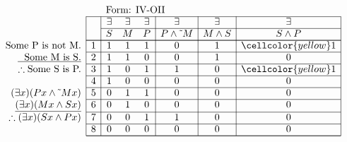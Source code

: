 \documentclass[10pt,legalpaper,landscape,cmtt]{article}
\begin{document}
{\begin{minipage}[t]{3.25in}
	\(
	\begin{array}{r|c|ccc|c|c|c|}
		\multicolumn{2}{c}{}&\multicolumn{6}{l}{\mbox{Form: IV-OII}} \\ \cline{2-8}
		\hspace{1in}	&	& \exists & \exists & \exists & \exists & \exists & \exists\\ \cline{3-8}
		&	& S & M & P &  P \wedge \tilde~M  &  M \wedge S  &  S \wedge P \\ \cline{2-8} \cline{2-8}
		\phantom{\therefore}\mbox{Some P is not M.}   & 1 & 1 & 1 & 1 &   0   &   1   &   \cellcolor{yellow} 1  \\ \cline{2-8}
		\underline{\phantom{\therefore}\mbox{Some M is S.}}   & 2 & 1 & 1 & 0 &   0   &   1   &   0  \\ \cline{2-8}
		\therefore \mbox{Some S is P.}   & 3 & 1 & 0 & 1 &   1   &   0   &   \cellcolor{yellow} 1  \\ \cline{2-8}
		& 4 & 1 & 0 & 0 &   0   &   0   &   0  \\ \cline{2-8}
		(\exists x)(Px \wedge \tilde~Mx)   & 5 & 0 & 1 & 1 &   0   &   0   &   0  \\ \cline{2-8}
		\underline{(\exists x)(Mx \wedge Sx)}   & 6 & 0 & 1 & 0 &   0   &   0   &   0  \\ \cline{2-8}
		\therefore(\exists x)(Sx \wedge Px)   & 7 & 0 & 0 & 1 &   1   &   0   &   0  \\ \cline{2-8}
		& 8 & 0 & 0 & 0 &   0   &   0   &   0   \\ \cline{2-8}\cline{2-8} 
	\end{array}
	\)
\end{minipage}

}
\end{document}
